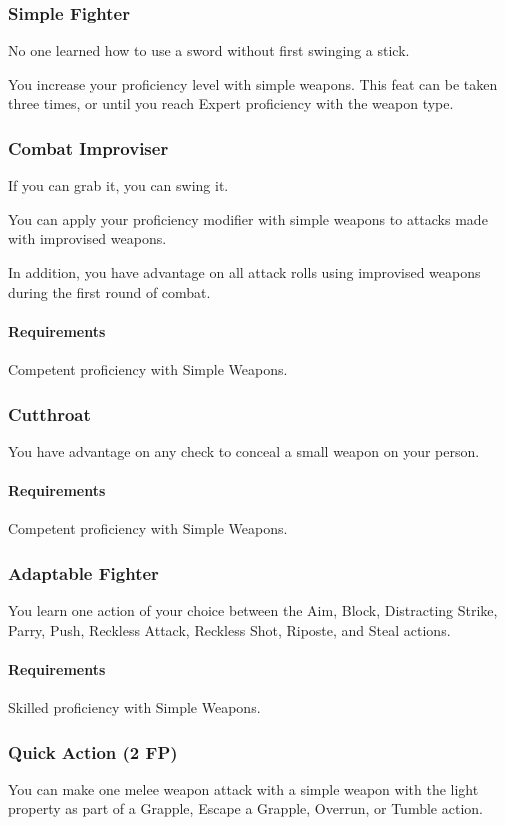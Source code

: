 \subsubsection{Simple Fighter} \label{feat::simplefighter}
    No one learned how to use a sword without first swinging a stick.

    You increase your proficiency level with simple weapons.
    This feat can be taken three times, or until you reach Expert proficiency with the weapon type.
\subsubsection{Combat Improviser} \label{feat::combatimproviser}
    If you can grab it, you can swing it.

    You can apply your proficiency modifier with simple weapons to attacks made with improvised weapons.

    In addition, you have advantage on all attack rolls using improvised weapons during the first round of combat.
    \paragraph{Requirements} Competent proficiency with Simple Weapons.
\subsubsection{Cutthroat} \label{feat::cutthroat}
    You have advantage on any check to conceal a small weapon on your person.
    \paragraph{Requirements} Competent proficiency with Simple Weapons.
\subsubsection{Adaptable Fighter} \label{feat::adaptablefighter}
    You learn one action of your choice between the Aim, Block, Distracting Strike, Parry, Push, Reckless Attack, Reckless Shot, Riposte, and Steal actions.
    \paragraph{Requirements} Skilled proficiency with Simple Weapons.
\subsubsection{Quick Action (2 FP)} \label{feat::quickaction}
    You can make one melee weapon attack with a simple weapon with the light property as part of a Grapple, Escape a Grapple, Overrun, or Tumble action.

